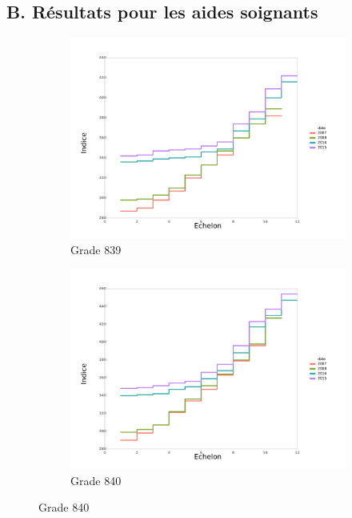 \documentclass[11pt,a4paper]{article}
\begin{document}
\clearpage

\subsection{B. Résultats pour les aides soignants}
\setcounter{table}{0}
\setcounter{figure}{0}
\renewcommand{\thefigure}{B.\arabic{figure}}
\renewcommand{\thetable}{B.\arabic{table}}




\begin{figure}[ht] 
  \caption{Evolution des grilles: grade par grade}
  \label{echelon_by_neg_AS} 
  \begin{subfigure}[b]{0.33\linewidth}
      \caption{Grade 839} 
    \label{echelon_by_neg_839} 
    \centering
    \includegraphics[width=1\linewidth]{AS_839_grille_by_neg.pdf} 
  \end{subfigure}%
  \begin{subfigure}[b]{0.33\linewidth}
        \caption{Grade 840} 
    \label{echelon_by_neg_840} 
    \centering
    \includegraphics[width=1\linewidth]{AS_840_grille_by_neg.pdf} 

\end{subfigure}
\end{figure}
\end{document}
